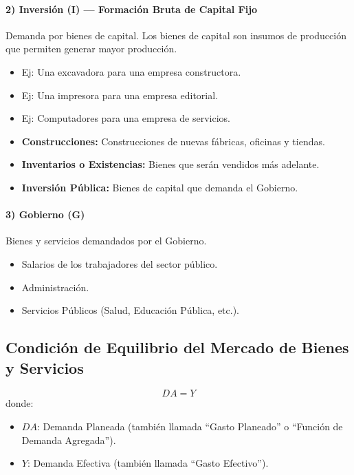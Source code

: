 \documentclass[11pt,a4paper]{article}
\begin{document}
\paragraph{2) Inversión (I) --- Formación Bruta de Capital Fijo}
Demanda por bienes de capital. Los bienes de capital son insumos de producción que permiten generar mayor producción.
\begin{itemize}
    \item Ej: Una excavadora para una empresa constructora.
    \item Ej: Una impresora para una empresa editorial.
    \item Ej: Computadores para una empresa de servicios.
    \item \textbf{Construcciones:} Construcciones de nuevas fábricas, oficinas y tiendas.
    \item \textbf{Inventarios o Existencias:} Bienes que serán vendidos más adelante.
    \item \textbf{Inversión Pública:} Bienes de capital que demanda el Gobierno.
\end{itemize}

\paragraph{3) Gobierno (G)}
Bienes y servicios demandados por el Gobierno.
\begin{itemize}
    \item Salarios de los trabajadores del sector público.
    \item Administración.
    \item Servicios Públicos (Salud, Educación Pública, etc.).
\end{itemize}

\subsection{Condición de Equilibrio del Mercado de Bienes y Servicios}

\begin{resultadobox}
\begin{equation}
    DA = Y \tag{1}
\end{equation}
donde:
\begin{itemize}
    \item $DA$: Demanda Planeada (también llamada ``Gasto Planeado'' o ``Función de Demanda Agregada'').
    \item $Y$: Demanda Efectiva (también llamada ``Gasto Efectivo'').
\end{itemize}
\end{resultadobox}
\end{document}
